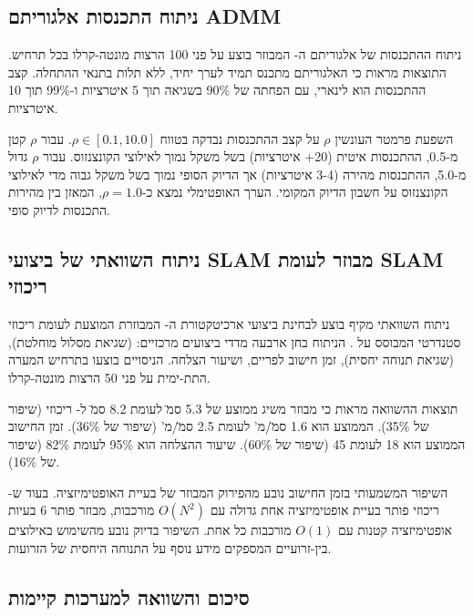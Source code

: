 \subsection{ניתוח התכנסות אלגוריתם ADMM}
\label{sec:ch04_admm_convergence}

ניתוח ההתכנסות של אלגוריתם ה- המבוזר בוצע על פני 100 הרצות מונטה-קרלו בכל תרחיש. התוצאות מראות כי האלגוריתם מתכנס תמיד לערך יחיד, ללא תלות בתנאי ההתחלה. קצב ההתכנסות הוא לינארי, עם הפחתה של 90\% בשגיאה תוך 5 איטרציות ו-99\% תוך 10 איטרציות.

השפעת פרמטר העונשין $\rho$ על קצב ההתכנסות נבדקה בטווח $\rho \in [0.1, 10.0]$. עבור $\rho$ קטן מ-0.5, ההתכנסות איטית (20+ איטרציות) בשל משקל נמוך לאילוצי הקונצנזוס. עבור $\rho$ גדול מ-5.0, ההתכנסות מהירה (3-4 איטרציות) אך הדיוק הסופי נמוך בשל משקל גבוה מדי לאילוצי הקונצנזוס על חשבון הדיוק המקומי. הערך האופטימלי נמצא כ-$\rho = 1.0$, המאזן בין מהירות התכנסות לדיוק סופי.

\subsection{ניתוח השוואתי של ביצועי SLAM מבוזר לעומת SLAM ריכוזי}
\label{sec:ch04_comparative_analysis}

ניתוח השוואתי מקיף בוצע לבחינת ביצועי ארכיטקטורת ה- המבוזרת המוצעת לעומת  ריכוזי סטנדרטי המבוסס על . הניתוח בחן ארבעה מדדי ביצועים מרכזיים:  (שגיאת מסלול מוחלטת),  (שגיאת תנוחה יחסית), זמן חישוב לפריים, ושיעור הצלחה. הניסויים בוצעו בתרחיש המערה התת-ימית על פני 50 הרצות מונטה-קרלו.

תוצאות ההשוואה מראות כי  מבוזר משיג  ממוצע של 5.3 ס\"מ לעומת 8.2 ס\"מ ל- ריכוזי (שיפור של 35\%).  הממוצע הוא 1.6 ס\"מ/מ' לעומת 2.5 ס\"מ/מ' (שיפור של 36\%). זמן החישוב הממוצע הוא 18  לעומת 45  (שיפור של 60\%). שיעור ההצלחה הוא 95\% לעומת 82\% (שיפור של 16\%).

השיפור המשמעותי בזמן החישוב נובע מהפירוק המבוזר של בעיית האופטימיזציה. בעוד ש- ריכוזי פותר בעיית אופטימיזציה אחת גדולה עם $O(N^2)$ מורכבות,  מבוזר פותר 6 בעיות אופטימיזציה קטנות עם $O(1)$ מורכבות כל אחת. השיפור בדיוק נובע מהשימוש באילוצים בין-זרועיים המספקים מידע נוסף על התנוחה היחסית של הזרועות.

\subsection{סיכום והשוואה למערכות קיימות}
\label{sec:ch04_summary}

